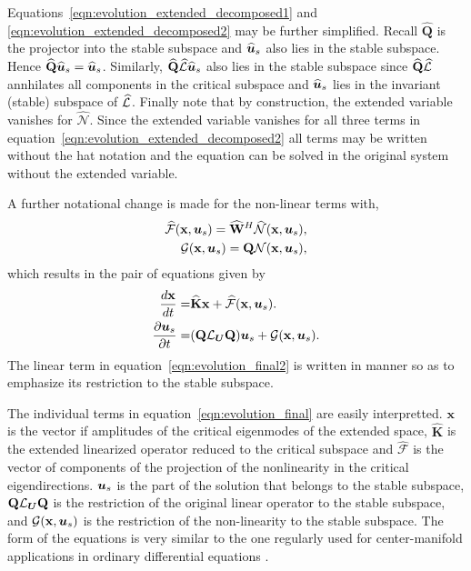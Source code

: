 Equations~\eqref{eqn:evolution_extended_decomposed1} and \eqref{eqn:evolution_extended_decomposed2} may be further simplified. Recall $\mathbf{\widehat{Q}}$ is the projector into the stable subspace and ${\widehat{\boldsymbol{u}}}_{s}$ also lies in the stable subspace. Hence $\mathbf{\widehat{Q}}{\widehat{\boldsymbol{u}}}_{s} = {\widehat{\boldsymbol{u}}}_{s}$. Similarly, $\mathbf{\widehat{Q}}\mathcal{\widehat{L}}{\widehat{\boldsymbol{u}}}_{s}$ also lies in the stable subspace since $\mathbf{\widehat{Q}}\mathcal{\widehat{L}}$ annhilates all components in the critical subspace and ${\widehat{\boldsymbol{u}}}_{s}$ lies in the invariant (stable) subspace of $\mathcal{\widehat{L}}$. Finally note that by construction, the extended variable vanishes for $\mathcal{\widehat{N}}$. Since the extended variable vanishes for all three terms in equation~\eqref{eqn:evolution_extended_decomposed2} all terms may be written without the hat notation and the equation can be solved in the original system without the extended variable. 

A further notational change is made for the non-linear terms with,
\begin{eqnarray}
	\mathcal{\widehat{F}}(\mathbf{x},\boldsymbol{u}_{s}) = \mathbf{\widehat{W}}^{H}\mathcal{\widehat{N}}(\mathbf{x},\boldsymbol{u}_{s}), \nonumber \\
	\mathcal{G}(\mathbf{x},\boldsymbol{u}_{s}) = \mathbf{Q}\mathcal{N}(\mathbf{x},\boldsymbol{u}_{s}), \nonumber
\end{eqnarray} 
which results in the pair of equations given by
\begin{subequations}
	\begin{align}
		\dfrac{d\mathbf{x}}{d t} =& \mathbf{\widehat{K}}\mathbf{x} + \mathcal{\widehat{F}}(\mathbf{x},\boldsymbol{u}_{s}) \label{eqn:evolution_final1}.\\
		\dfrac{\partial \boldsymbol{u}_{s}}{\partial t} =& (\mathbf{Q}\mathcal{L}_{\boldsymbol{U}} \mathbf{Q})\boldsymbol{u}_{s} + \mathcal{G}(\mathbf{x},\boldsymbol{u}_{s})
		\label{eqn:evolution_final2}. 
	\end{align}
	\label{eqn:evolution_final}
\end{subequations}
 The linear term in equation~\eqref{eqn:evolution_final2} is written in manner so as to emphasize its restriction to the stable subspace. 
 
 The individual terms in equation~\eqref{eqn:evolution_final} are easily interpretted. $\mathbf{x}$ is the vector if amplitudes of the critical eigenmodes of the extended space, $\mathbf{\widehat{K}}$ is the extended linearized operator reduced to the critical subspace and $\mathcal{\widehat{F}}$ is the vector of components of the projection of the nonlinearity in the critical eigendirections. $\boldsymbol{u}_{s}$ is the part of the solution that belongs to the stable subspace, $\mathbf{Q}\mathcal{L}_{\boldsymbol{U}}\mathbf{Q}$ is the restriction of the original linear operator to the stable subspace, and $\mathcal{G}(\mathbf{x},\boldsymbol{u}_{s})$ is the restriction of the non-linearity to the stable subspace. The form of the equations is very similar to the one regularly used for center-manifold applications in ordinary differential equations \citep{guckenheimer83,wiggins03}. 
 
